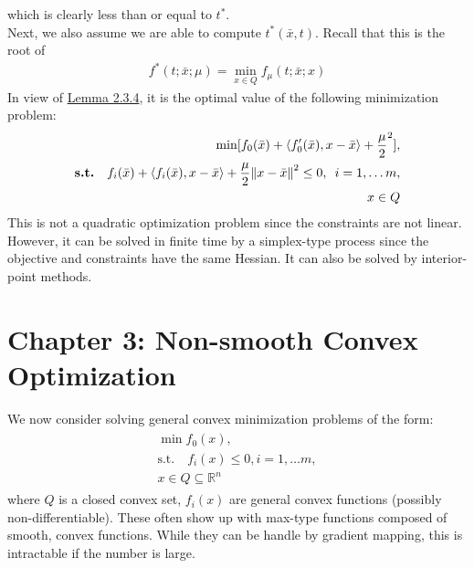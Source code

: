 \documentclass[12pt,a4paper]{article}
\begin{document}
	 which is clearly less than or equal to $t^*$. \\
	 Next, we also assume we are able to compute $t^*(\bar{x},t)$. Recall that this is the root of
	 \begin{align*}
	 	f^*(t;\bar{x};\mu) = \min_{x \in Q}f_{\mu}(t;\bar{x};x)
	 \end{align*}
	 In view of \hyperref[lem234]{Lemma 2.3.4}, it is the optimal value of the following minimization problem:
	 \begin{align*}
	 	\min[f_0(\bar{x}) + \langle f_0'(\bar{x}), x - \bar{x} \rangle + \frac{\mu}{2}^2], \\
	 	\textbf{s.t.} \hspace{10pt} f_i(\bar{x}) + \langle f_i(\bar{x}), x - \bar{x} \rangle + \frac{\mu}{2}\norm{x - \bar{x}}^2 \leq 0, \hspace{5pt} i=1, \ldots m, \\
	 	x \in Q
	 \end{align*}
	 This is not a quadratic optimization problem since the constraints are not linear. However, it can be solved in finite time by a simplex-type process since the objective and constraints have the same Hessian. It can also be solved by interior-point methods.
	 \newpage
	 \section*{Chapter 3: Non-smooth Convex Optimization}\label{sec:3}
	 We now consider solving general convex minimization problems of the form:
	 \begin{align}\label{3.1.1}
	 	\begin{gathered}
	 		\min f_0(x), \\
	 		\text{s.t.} \quad f_i(x) \leq 0, i= 1, \ldots m \tag{3.1.1}, \\
	 		x \in Q \subseteq \mathbb{R}^n
	 	\end{gathered}
	 \end{align}
	 where $Q$ is a closed convex set, $f_i(x)$ are general convex functions (possibly non-differentiable). These often show up with max-type functions composed of smooth, convex functions. While they can be handle by gradient mapping, this is intractable if the number is large.
\end{document}
